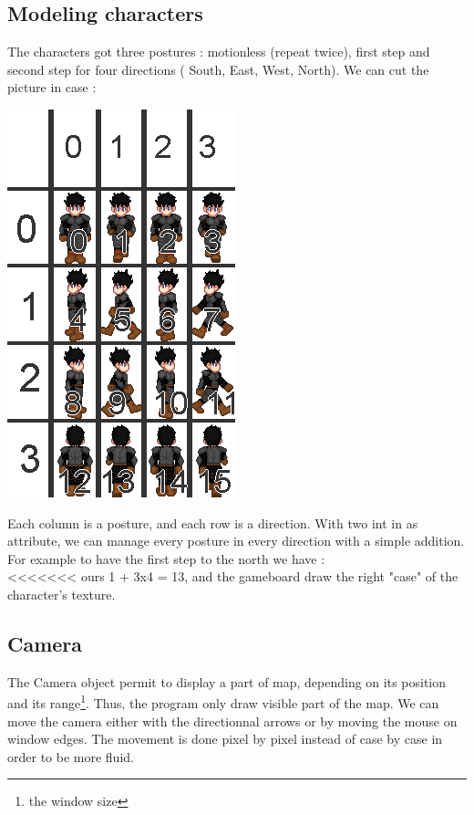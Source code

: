 \documentclass{scrreprt}
\begin{document}
	\subsection{Modeling characters}
	The characters got three postures : motionless (repeat twice), first step and second step for four directions ( South, East, West, North). We can cut the picture in case : 
	\begin{center}
	\includegraphics[scale=0.4]{char.png}
	\end{center}
	Each column is a posture, and each row is a direction. With two int in as attribute, we can manage every posture in every direction with a simple addition. For example to have the first step to the north we have :\\
<<<<<<< ours
		1 + 3x4 = 13, and the gameboard draw the right "case" of the character's texture.
		\subsection{Camera}
		The Camera object permit to display a part of map, depending on its position and its range\footnote{the window size}. Thus, the program only draw visible part of the map. We can move the camera either with the directionnal arrows or by moving the mouse on window edges. The movement is done pixel by pixel instead of case by case in order to be more fluid.
\end{document}
